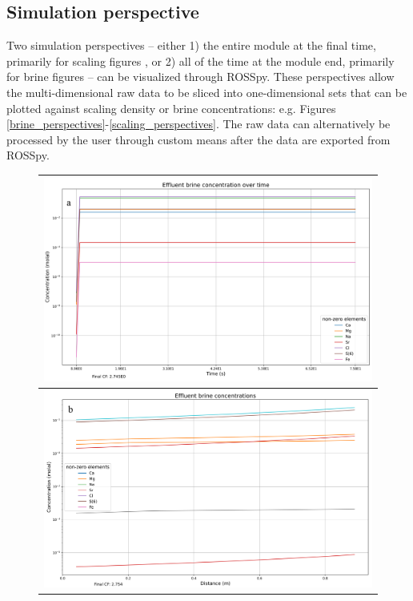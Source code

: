 \subsection{Simulation perspective}
Two simulation perspectives -- either 1) the entire module at the final time, primarily for scaling figures \cite{Chai2007UltrasoundModules}, or 2) all of the time at the module end, primarily for brine figures -- can be visualized through ROSSpy. These perspectives allow the multi-dimensional raw data to be sliced into one-dimensional sets that can be plotted against scaling density or brine concentrations: e.g. Figures \ref{brine_perspectives}-\ref{scaling_perspectives}. The raw data can alternatively be processed by the user through custom means after the data are exported from ROSSpy.

\begin{figure}[t]
    \centering
    \begin{tabular}{c}
        \includegraphics[width=\linewidth]{images/ROSSpy/sensitivity_analyses/simulation_perspective/brine_all_time.png} \\ \midrule
        \includegraphics[width=\linewidth]{images/ROSSpy/sensitivity_analyses/simulation_perspective/brine_all_distance.png}

\end{tabular}
\end{figure}
